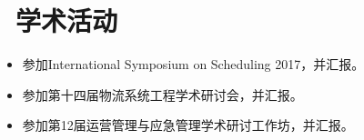 \documentclass[11pt]{article}
\begin{document}
\section{\makebox[\widthof{\faGraduationCap}][c]{\color{CVBlue}\faInfo}\ 学术活动}
\begin{itemize}[parsep=0.5ex]
	\item 参加International Symposium on Scheduling 2017，并汇报。
	\item 参加第十四届物流系统工程学术研讨会，并汇报。
	\item 参加第12届运营管理与应急管理学术研讨工作坊，并汇报。
\end{itemize}

\end{document}

